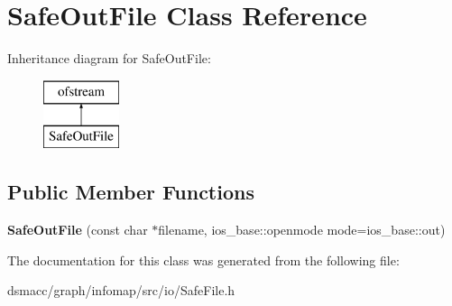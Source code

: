 \hypertarget{classSafeOutFile}{}\section{Safe\+Out\+File Class Reference}
\label{classSafeOutFile}
Inheritance diagram for Safe\+Out\+File\+:\begin{figure}[H]
\begin{center}
\leavevmode
\includegraphics[height=2.000000cm]{classSafeOutFile}
\end{center}
\end{figure}
\subsection*{Public Member Functions}
\begin{DoxyCompactItemize}
\item 
\mbox{\label{classSafeOutFile_af5ce276c22888e65c763aa5b4d896a5a}} 
{\bfseries Safe\+Out\+File} (const char $\ast$filename, ios\+\_\+base\+::openmode mode=ios\+\_\+base\+::out)
\end{DoxyCompactItemize}


The documentation for this class was generated from the following file\+:\begin{DoxyCompactItemize}
\item 
dsmacc/graph/infomap/src/io/Safe\+File.\+h\end{DoxyCompactItemize}

